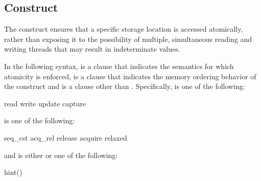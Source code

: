 \subsection{ Construct}
\label{subsec:atomic Construct}
\summary
The  construct ensures that a specific storage location is accessed atomically,
rather than exposing it to the possibility of multiple, simultaneous reading and writing
threads that may result in indeterminate values.

\syntax
In the following syntax,  is a clause that indicates
the semantics for which atomicity is enforced,  is
a clause that indicates the memory ordering behavior of the construct and
 is a clause other than .
Specifically,  is one of the following:

\begin{indentedcodelist}
read
write
update
capture
\end{indentedcodelist}

 is one of the following:

\begin{indentedcodelist}
seq_cst
acq_rel
release
acquire
relaxed
\end{indentedcodelist}

and  is either  or one of the following:

\begin{indentedcodelist}
hint()
\end{indentedcodelist}

